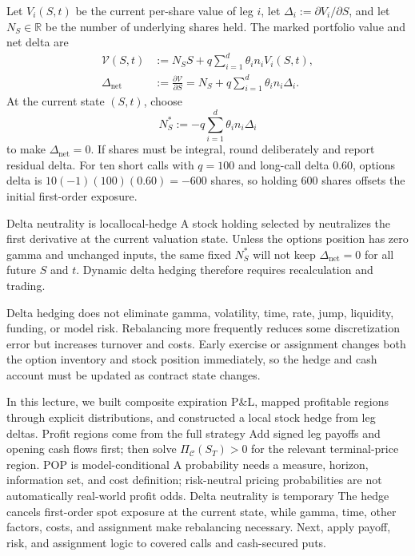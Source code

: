 \documentclass[11pt]{article}
\newcommand{\R}{\mathbb{R}}
\begin{document}
Let $V_i(S,t)$ be the current per-share value of leg $i$, let $\Delta_i:=\partial V_i/\partial S$, and let $N_S\in\R$ be the number of underlying shares held. The marked portfolio value and net delta are
\begin{align}
  \label{eq:portfolio-value}
  \mathcal V(S,t)
  &:=N_SS+q\sum_{i=1}^{d}\theta_i n_iV_i(S,t),\\
  \label{eq:net-delta}
  \Delta_{\mathrm{net}}
  &:=\frac{\partial\mathcal V}{\partial S}
   =N_S+q\sum_{i=1}^{d}\theta_i n_i\Delta_i.
\end{align}
At the current state $(S,t)$, choose
\begin{equation}
  \label{eq:hedge-shares}
  N_S^*:=-q\sum_{i=1}^{d}\theta_i n_i\Delta_i
\end{equation}
to make $\Delta_{\mathrm{net}}=0$. If shares must be integral, round deliberately and report residual delta. For ten short calls with $q=100$ and long-call delta $0.60$, options delta is $10(-1)(100)(0.60)=-600$ shares, so holding $600$ shares offsets the initial first-order exposure.

\begin{theorem}{Delta neutrality is local}{local-hedge}
A stock holding selected by  neutralizes the first derivative at the current valuation state. Unless the options position has zero gamma and unchanged inputs, the same fixed $N_S^*$ will not keep $\Delta_{\mathrm{net}}=0$ for all future $S$ and $t$. Dynamic delta hedging therefore requires recalculation and trading.
\end{theorem}

Delta hedging does not eliminate gamma, volatility, time, rate, jump, liquidity, funding, or model risk. Rebalancing more frequently reduces some discretization error but increases turnover and costs. Early exercise or assignment changes both the option inventory and stock position immediately, so the hedge and cash account must be updated as contract state changes.

\Needspace{0.38\textheight}
\keytakeaways
  {In this lecture, we built composite expiration P\&L, mapped profitable regions through explicit distributions, and constructed a local stock hedge from leg deltas.}
  {Profit regions come from the full strategy}
  {Add signed leg payoffs and opening cash flows first; then solve $\Pi_{\mathcal C}(S_T)>0$ for the relevant terminal-price region.}
  {POP is model-conditional}
  {A probability needs a measure, horizon, information set, and cost definition; risk-neutral pricing probabilities are not automatically real-world profit odds.}
  {Delta neutrality is temporary}
  {The hedge cancels first-order spot exposure at the current state, while gamma, time, other factors, costs, and assignment make rebalancing necessary.}
  {Next, apply payoff, risk, and assignment logic to covered calls and cash-secured puts.}
\end{document}
